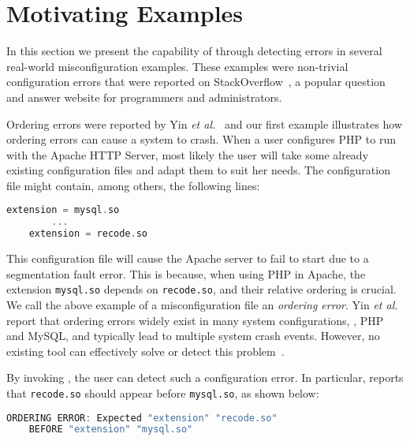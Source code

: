 \section{Motivating Examples}
\label{sec-motiv}

In this section we present the capability of \app through 
detecting errors in several real-world misconfiguration examples. 
These examples were non-trivial configuration errors
that were reported on StackOverflow~\cite{stackoverflow},
a popular question and answer website for programmers and administrators. 

Ordering errors were reported by Yin {\em et al.}~\cite{yin11anempirical} and our first
example illustrates how ordering errors can cause a system to crash. When a user configures PHP 
to run with the
Apache HTTP Server, most likely the user will take some already existing configuration files and adapt them
to suit her needs. The configuration file might contain, among others, 
the following lines:

\begin{lstlisting}[language=C, xleftmargin=.01\textwidth]
    extension = mysql.so
        ...
    extension = recode.so
\end{lstlisting}

This configuration file will cause the Apache server to 
fail to start due to a segmentation fault error. 
This is because, when using PHP in Apache, the extension {\tt mysql.so} 
depends on {\tt recode.so}, and their relative ordering
is crucial. 
We call the above example of a misconfiguration file
an {\em ordering error}.
Yin {\em et al.} report that ordering errors widely exist in
many system configurations, \eg, PHP and MySQL,
and typically lead to multiple system crash events.
However, no existing tool can effectively solve 
or detect this problem~\cite{zhang14encore, xu15systems, xu13do}.

By invoking \app, the user can detect such a configuration error.
In particular, \app reports that {\tt recode.so} 
should appear before {\tt mysql.so}, as shown
below: 

\begin{lstlisting}[language=C, xleftmargin=.01\textwidth]
    ORDERING ERROR: Expected "extension" "recode.so"
    BEFORE "extension" "mysql.so"
\end{lstlisting} 

